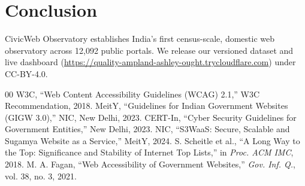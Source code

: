 \documentclass[conference]{IEEEtran}
\begin{document}
\section{Conclusion}
CivicWeb Observatory establishes India's first census-scale, domestic web observatory across 12,092 public portals. We release our versioned dataset and live dashboard (\url{https://quality-ampland-ashley-ought.trycloudflare.com}) under CC-BY-4.0.

\begin{thebibliography}{00}
 W3C, ``Web Content Accessibility Guidelines (WCAG) 2.1,'' W3C Recommendation, 2018.
 MeitY, ``Guidelines for Indian Government Websites (GIGW 3.0),'' NIC, New Delhi, 2023.
 CERT-In, ``Cyber Security Guidelines for Government Entities,'' New Delhi, 2023.
 NIC, ``S3WaaS: Secure, Scalable and Sugamya Website as a Service,'' MeitY, 2024.
 S. Scheitle et al., ``A Long Way to the Top: Significance and Stability of Internet Top Lists,'' in \textit{Proc. ACM IMC}, 2018.
 M. A. Fagan, ``Web Accessibility of Government Websites,'' \textit{Gov. Inf. Q.}, vol. 38, no. 3, 2021.
\end{thebibliography}
\end{document}
